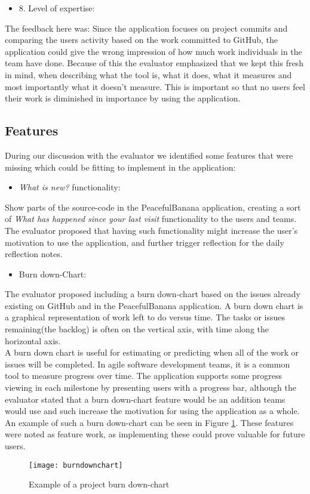 \begin{itemize}
    \item 8. Level of expertise:   
\end{itemize}
The feedback here was: Since the application focuses on project commits and comparing the users activity based on the work committed to GitHub, the application could give the wrong impression of how much work individuals in the team have done. Because of this the evaluator emphasized that we kept this fresh in mind, when describing what the tool is, what it does, what it measures and most importantly what it doesn't measure. This is important so that no users feel their work is diminished in importance by using the application.

\subsection{Features}
During our discussion with the evaluator we identified some features that were missing which could be fitting to implement in the application:
\begin{itemize}
	\item \emph{What is new?} functionality:
\end{itemize}
Show parts of the source-code in the PeacefulBanana application, creating a sort of \emph{What has happened since your last visit} functionality to the users and teams. The evaluator proposed that having such functionality might increase the user's motivation to use the application, and further trigger reflection for the daily reflection notes. 
\begin{itemize}
	\item Burn down-Chart:
\end{itemize}
The evaluator proposed including a burn down-chart based on the issues already existing on GitHub and in the PeacefulBanana application. A burn down chart is a graphical representation of work left to do versus time. The tasks or issues remaining(the backlog) is often on the vertical axis, with time along the horizontal axis.\\
A burn down chart is useful for estimating or predicting when all of the work or issues will be completed. In agile software development teams, it is a common tool to measure progress over time. The application supports some progress viewing in each milestone by presenting users with a progress bar, although the evaluator stated that a burn down-chart feature would be an addition teams would use and such increase the motivation for using the application as a whole. An example of such a burn down-chart can be seen in Figure \ref{burndownchart}. 
These features were noted as feature work, as implementing these could prove valuable for future users. 

\begin{figure}[H]
    \centering
        \texttt{[image: burndownchart]}
    \caption{Example of a project burn down-chart}
    \label{burndownchart}
\end{figure}
\clearpage
